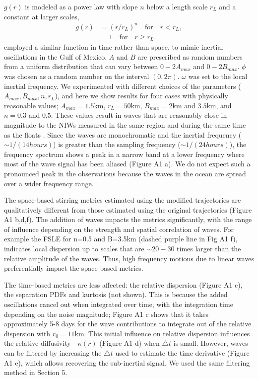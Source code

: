\documentclass[]{ametsoc}
\begin{document}
$g(r)$ is modeled as a power law with slope $n$ below a length scale $r_L$ and a constant at larger scales, 
\begin{equation}
    \begin{split}
        g(r) & = (r/r_L)^n \quad \text{for} \quad r<r_L, \\
             & = 1 \quad \text{for} \quad r\geq r_L.
    \end{split}
\end{equation}
\cite{vera2016} employed a similar function in time rather than space, to mimic inertial oscillations in the Gulf of Mexico.
$A$ and $B$ are prescribed as random numbers from a uniform distribution that can vary between $0-2A_{max}$ and $0-2B_{max}$. $\phi$ was chosen as a random number on the interval $(0, 2\pi)$. $\omega$ was set to the local inertial frequency. We experimented with different choices of the parameters ($A_{max}, B_{max}, n, r_L$), and here we show results for four cases with physically reasonable values; $A_{max}=1.5$km, $r_L=50$km, $B_{max}=2$km and $3.5$km, and $n=0.3$ and $0.5$. These values result in waves that are reasonably close in magnitude to the NIWs measured in the same region and during the same time as the floats \citep{kilbourne2015quantifying}. %
Since the waves are monochromatic and the inertial frequency ($\sim 1/(14 hours)$) is greater than the sampling frequency ($\sim 1/(24 hours)$), the frequency spectrum shows a peak in a narrow band at a lower frequency where most of the wave signal has been aliased (Figure A1 a). We do not expect such a pronounced peak in the observations because the waves in the ocean are spread over a wider frequency range.

The space-based stirring metrics estimated using the modified trajectories are qualitatively different from those estimated using the original trajectories (Figure A1 b,d,f). The addition of waves impacts the metrics significantly, with the range of influence depending on the strength and spatial correlation of waves. For example the FSLE for n=0.5 and B=3.5km (dashed purple line in Fig A1 f), indicates local dispersion up to scales that are $\sim20-30$ times larger than the relative amplitude of the waves. Thus, high frequency motions due to linear waves preferentially impact the space-based metrics.

The time-based metrics are less affected: the relative dispersion (Figure A1 c), the separation PDFs and kurtosis (not shown). This is because the added oscillations cancel out when integrated over time, with the integration time depending on the noise magnitude; Figure A1 c shows that it takes approximately 5-8 days for the wave contributions to integrate out of the relative dispersion with $r_0=11$km. This initial influence on relative dispersion influences the relative diffusivity - $\kappa(r)$ (Figure A1 d) when $\triangle t$ is small. However, waves can be filtered by increasing the $\triangle t$ used to estimate the time derivative (Figure A1 e), which allows recovering the sub-inertial signal. We used the same filtering method in Section 5.  
\end{document}
